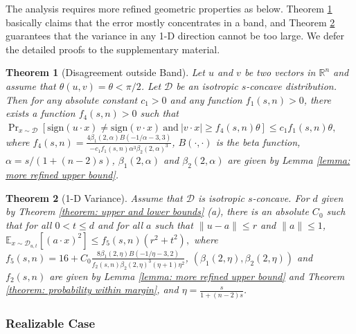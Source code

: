 \documentclass[11pt]{article}
\newcommand{\cD}{\mathcal{D}}
\newcommand{\E}{\mathbb{E}}
\newcommand{\R}{\mathbb{R}}
\newtheorem{theorem}{Theorem}
\newtheorem{remark}{Remark}
\begin{document}
The analysis requires more refined geometric properties as below. Theorem \ref{theorem: disagreement outside band} basically claims that the error mostly concentrates in a band, and Theorem \ref{theorem: 1-D variance} guarantees that the variance in any 1-D direction cannot be too large. We defer the detailed proofs to the supplementary material.







\begin{theorem}[Disagreement outside Band]
\label{theorem: disagreement outside band}
Let $u$ and $v$ be two vectors in $\R^n$ and assume that $\theta(u,v)=\theta<\pi/2$. Let $\mathcal{D}$ be an isotropic $s$-concave distribution. Then for any absolute constant $c_1>0$ and any function $f_1(s,n)>0$, there exists a function $f_4(s,n)>0$ such that
$
\Pr_{x\sim\mathcal{D}}[\mathrm{sign}(u\cdot x)\not=\mathrm{sign}(v\cdot x)\ \text{and}\ |v\cdot x|\ge f_4(s,n)\theta]\le c_1f_1(s,n)\theta,
$
where $f_4(s,n)=\frac{4\beta_1(2,\alpha)B(-1/\alpha-3,3)}{-c_1f_1(s,n)\alpha^3\beta_2(2,\alpha)^3}$, $B(\cdot,\cdot)$ is the beta function, $\alpha=s/(1+(n-2)s)$, $\beta_1(2,\alpha)$ and $\beta_2(2,\alpha)$ are given by Lemma \ref{lemma: more refined upper bound}.
\end{theorem}



\begin{theorem}[1-D Variance]
\label{theorem: 1-D variance}
Assume that $\cD$ is isotropic $s$-concave. For $d$ given by Theorem \ref{theorem: upper and lower bounds} (a), there is an absolute $C_0$ such that for all $0<t\le d$ and for all $a$ such that $\|u-a\|\le r$ and $\|a\|\le 1$,
$
\E_{x\sim \cD_{u,t}}[(a\cdot x)^2]\le f_5(s,n)(r^2+t^2),
$
where $f_5(s,n)=16+C_0\frac{8\beta_1(2,\eta)B(-1/\eta-3,2)}{f_2(s,n)\beta_2(2,\eta)^3(\eta+1)\eta^2}$, $(\beta_1(2,\eta), \beta_2(2,\eta))$ and $f_2(s,n)$ are given by Lemma \ref{lemma: more refined upper bound} and Theorem \ref{theorem: probability within margin}, and $\eta=\frac{s}{1+(n-2)s}$.
\end{theorem}


\subsubsection{Realizable Case}
\end{document}
